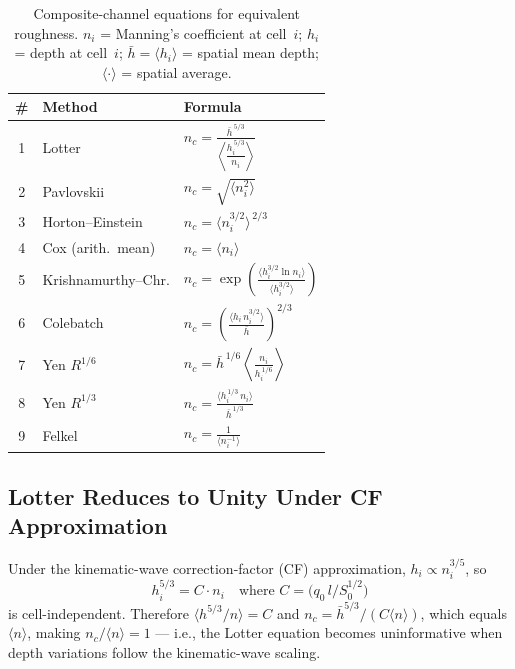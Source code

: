 \documentclass[11pt]{article}
\newcommand{\avg}[1]{\langle #1 \rangle}
\newcommand{\nc}{n_c}
\newcommand{\So}{S_0}
\begin{document}
\medskip
\begin{table}[h!]
\centering
\renewcommand{\arraystretch}{1.6}
\begin{tabularx}{\textwidth}{@{}clX@{}}
\toprule
\# & Method & Formula \\
\midrule
1 & Lotter &
  $\displaystyle \nc = \frac{\bar{h}^{\,5/3}}%
  {\left\langle \dfrac{h_i^{\,5/3}}{n_i} \right\rangle}$ \\[4pt]

2 & Pavlovskii &
  $\displaystyle \nc = \sqrt{\avg{n_i^2}}$ \\

3 & Horton--Einstein &
  $\displaystyle \nc = \avg{n_i^{3/2}}^{\,2/3}$ \\

4 & Cox (arith.\ mean) &
  $\displaystyle \nc = \avg{n_i}$ \\

5 & Krishnamurthy--Chr. &
  $\displaystyle \nc = \exp\!\left(\frac{\avg{h_i^{3/2}\ln n_i}}%
  {\avg{h_i^{3/2}}}\right)$ \\[4pt]

6 & Colebatch &
  $\displaystyle \nc = \left(\frac{\avg{h_i\, n_i^{3/2}}}%
  {\bar{h}}\right)^{\!2/3}$ \\[4pt]

7 & Yen $R^{1/6}$ &
  $\displaystyle \nc = \bar{h}^{\,1/6}\left\langle
  \frac{n_i}{h_i^{\,1/6}} \right\rangle$ \\[4pt]

8 & Yen $R^{1/3}$ &
  $\displaystyle \nc = \frac{\avg{h_i^{\,1/3}\, n_i}}%
  {\bar{h}^{\,1/3}}$ \\[4pt]

9 & Felkel &
  $\displaystyle \nc = \frac{1}{\avg{n_i^{-1}}}$ \\
\bottomrule
\end{tabularx}
\caption{Composite-channel equations for equivalent roughness.
  $n_i$ = Manning's coefficient at cell~$i$;
  $h_i$ = depth at cell~$i$;
  $\bar{h} = \avg{h_i}$ = spatial mean depth;
  $\avg{\cdot}$ = spatial average.}
\label{tab:channel-eqs}
\end{table}

\subsection{Lotter Reduces to Unity Under CF Approximation}

Under the kinematic-wave correction-factor (CF) approximation, $h_i \propto n_i^{3/5}$, so
\[
  h_i^{5/3} = C \cdot n_i
  \quad\text{where } C = \bigl(q_0\, l / \So^{1/2}\bigr)
\]
is cell-independent.  Therefore $\avg{h^{5/3}/n} = C$ and $\nc = \bar{h}^{5/3}/(C\avg{n})$, which equals $\avg{n}$, making $\nc/\avg{n} = 1$ --- i.e., the Lotter equation becomes uninformative when depth variations follow the kinematic-wave scaling.
\end{document}
